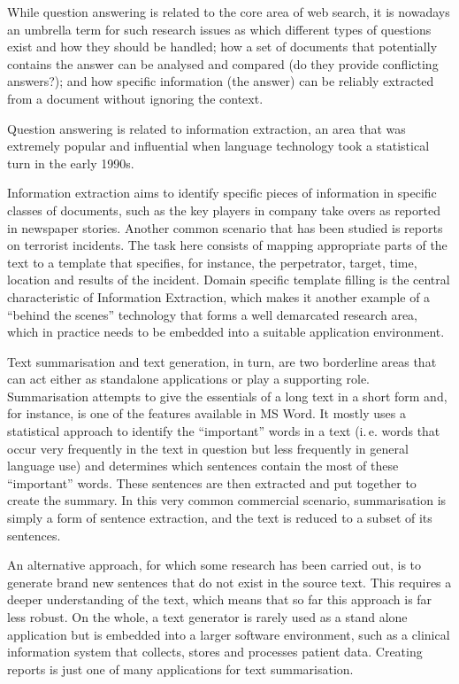 \begin{multicols}{2}
While question answering is related to the core area of web search, it is nowadays an umbrella term for such research issues as which different types of questions exist and how they should be handled; how a set of documents that potentially contains the answer can be analysed and compared (do they provide conflicting answers?); and how specific information (the answer) can be reliably extracted from a document without ignoring the context. 

Question answering is related to information extraction, an area that was extremely popular and influential when language technology 
took a statistical turn in the early 1990s. 

Information extraction aims to identify specific pieces of information in specific classes of documents, such as the key players in company take overs as reported in newspaper stories. Another common scenario that has been studied is reports on terrorist incidents. The task here consists of mapping appropriate parts of the text to a template that specifies, for instance, the perpetrator, target, time, location and results of the incident. Domain specific template filling is the central characteristic of Information Extraction, which makes it another example of a “behind the scenes” technology that forms a well demarcated research area, which in practice needs to be embedded into a suitable application environment. 

Text summarisation and text generation, in turn, are two borderline areas that can act either as standalone applications or play a supporting role. Summarisation attempts to give the essentials of a long text in a short form and, for instance, is one of the features available in MS Word. It mostly uses a statistical approach to identify the “important” words in a text (i.\,e. words that occur very frequently in the text in question but less frequently in general language use) and determines which sentences contain the most of these “important” words. These sentences are then extracted and put together to create the summary. In this very common commercial scenario, summarisation is simply a form of sentence extraction, and the text is reduced to a subset of its sentences. 

An alternative approach, for which some research has been carried out, is to generate brand new sentences that do not exist in the source text. 
This requires a deeper understanding of the text, which means that so far this approach is far less robust. On the whole, a text generator is rarely used as a stand alone application but is embedded into a larger software environment, such as a clinical information system that collects, stores and processes patient data. Creating reports is just one of many applications for text summarisation. 


\end{multicols}
